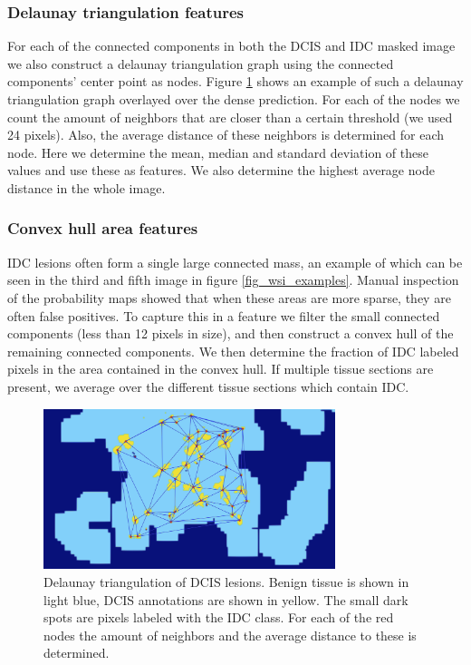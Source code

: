 \documentclass[journal]{IEEEtran}
\begin{document}
\subsubsection{Delaunay triangulation features}
For each of the connected components in both the DCIS and IDC masked image we also construct a delaunay triangulation graph using the connected components' center point as nodes. Figure \ref{fig_delaunay} shows an example of such a delaunay triangulation graph overlayed over the dense prediction. For each of the nodes we count the amount of neighbors that are closer than a certain threshold (we used 24 pixels). Also, the average distance of these neighbors is determined for each node. Here we determine the mean, median and standard deviation of these values and use these as features. We also determine the highest average node distance in the whole image.

\subsubsection{Convex hull area features}
IDC lesions often form a single large connected mass, an example of which can be seen in the third and fifth image in figure \ref{fig_wsi_examples}. Manual inspection of the probability maps showed that when these areas are more sparse, they are often false positives. To capture this in a feature we filter the small connected components (less than 12 pixels in size), and then construct a convex hull of the remaining connected components. We then determine the fraction of IDC labeled pixels in the area contained in the convex hull. If multiple tissue sections are present, we average over the different tissue sections which contain IDC.





\begin{figure}[!t]
\centering{}
\includegraphics[width=3.35in]{feature_delaunay}
\vspace{-0.15cm}\caption{Delaunay triangulation of DCIS lesions. Benign tissue is shown in light blue, DCIS annotations are shown in yellow. The small dark spots are pixels labeled with the IDC class. For each of the red nodes the amount of neighbors and the average distance to these is determined.}
\label{fig_delaunay}
\end{figure}
\end{document}
